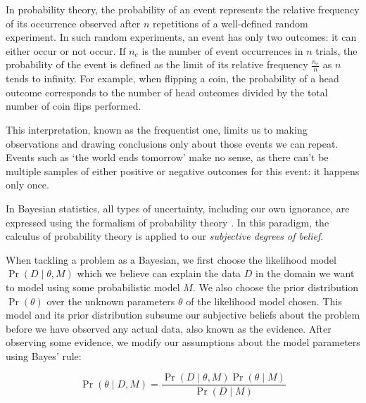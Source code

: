 
In probability theory, the probability of an event represents the relative frequency of its occurrence observed after $n$ repetitions of a well-defined random experiment. In such random experiments, an event has only two outcomes: it can either occur or not occur. If $n_e$ is the number of event occurrences in $n$ trials, the probability of the event is defined as the limit of its relative frequency $\frac{n_e}{n}$ as $n$ tends to infinity. For example, when flipping a coin, the probability of a head outcome corresponds to the number of head outcomes divided by the total number of coin flips performed. %


This interpretation, known as the frequentist one, limits us to making observations and drawing conclusions only about those events we can repeat. Events such as `the world ends tomorrow' make no sense, as there can't be multiple samples of either positive or negative outcomes for this event: it happens only once. 

In Bayesian statistics, all types of uncertainty, including our own ignorance, are expressed using the formalism of probability theory \citep{gha12}. In this paradigm, the calculus of probability theory is applied to our \emph{subjective degrees of belief}. 

When tackling a problem as a Bayesian, we first choose the likelihood model $ \Pr(D \mid \theta, M)$ which we believe can explain the data $D$ in the domain we want to model using some probabilistic model $M$. We also choose the prior distribution $\Pr(\theta)$ over the unknown parameters $ \theta $ of the likelihood model chosen. This model and its prior distribution subsume our subjective beliefs about the problem before we have observed any actual data, also known as the evidence. After observing some evidence, we modify our assumptions about the model parameters using Bayes' rule:

\begin{equation*} \Pr ( \theta \mid D, M) = \frac{ \Pr ( D \mid \theta, M) \Pr ( \theta \mid M) }{\Pr( D \mid M)} \end{equation*} 


